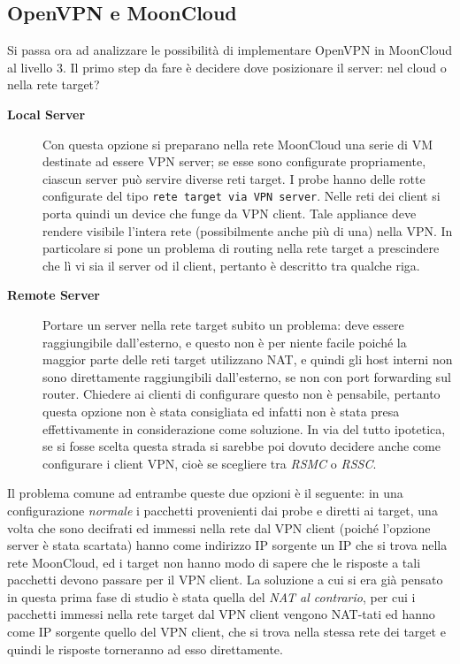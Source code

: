 \subsection{OpenVPN e MoonCloud}
Si passa ora ad analizzare le possibilità di implementare OpenVPN in MoonCloud al livello 3. Il primo step
da fare è decidere dove posizionare il server: nel cloud o nella rete target?
\begin{description}
  \item[\textbf{Local Server}]Con questa opzione si preparano nella rete MoonCloud una serie
  di VM destinate ad essere VPN server; se esse sono configurate propriamente, ciascun server
  può servire diverse reti target. I probe
  hanno delle rotte configurate del tipo \texttt{rete target via VPN server}.
  Nelle reti dei client si porta quindi un device che funge da VPN client.
  Tale appliance deve rendere visibile l'intera rete (possibilmente anche più di una) nella VPN. In
  particolare si pone un problema di routing nella rete target a prescindere che lì vi sia
  il server od il client, pertanto è descritto tra qualche riga.
  \item[\textbf{Remote Server}]Portare un server nella rete target subito un problema: deve
  essere raggiungibile dall'esterno, e questo non è per niente facile poiché la maggior parte
  delle reti target utilizzano NAT, e quindi gli host interni non sono direttamente raggiungibili
  dall'esterno, se non con port forwarding sul router. Chiedere ai clienti di configurare
  questo non è pensabile, pertanto questa opzione non è stata consigliata ed infatti
  non è stata presa effettivamente in considerazione come soluzione.
  In via del tutto ipotetica, se si fosse scelta questa strada si sarebbe poi
  dovuto decidere anche come configurare i client VPN, cioè se scegliere tra \textit{RSMC}
  o \textit{RSSC}.
\end{description}
Il problema comune ad entrambe queste due opzioni è il seguente: in una configurazione
\textit{normale} i pacchetti provenienti dai probe e diretti ai target, una volta che
sono decifrati ed immessi nella rete dal VPN client (poiché l'opzione server
è stata scartata) hanno come indirizzo IP sorgente un IP che si trova nella rete MoonCloud,
ed i target non hanno modo di sapere che le risposte a tali pacchetti devono passare
per il VPN client. La soluzione a cui si era già pensato in questa prima fase di studio
è stata quella del \textit{NAT al contrario}, per cui i pacchetti immessi nella rete
target dal VPN client vengono NAT-tati ed hanno come IP sorgente quello del VPN
client, che si trova nella stessa rete dei target e quindi le risposte torneranno
ad esso direttamente.

